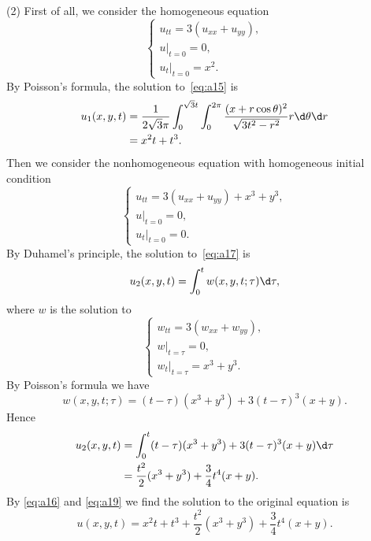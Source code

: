 \begin{solve}
  (2) First of all, we consider the homogeneous equation
  \begin{equation}\label{eq:a15}
    \begin{cases}
      u_{tt} = 3(u_{xx} + u_{yy}), \\
      u|_{t=0} = 0, \\
      u_t|_{t=0} = x^2.
    \end{cases}
  \end{equation}
  By Poisson's formula, the solution to~\eqref{eq:a15} is
  \begin{equation}\label{eq:a16}
    \begin{aligned}
      u_1(x,y,t)
      & = \frac{1}{2\sqrt{3}\pi} \int_0^{\sqrt3 t}\int_0^{2\pi} 
          \frac{(x+r\cos\theta)^2}{\sqrt{3t^2 - r^2}} r \d\theta\d r \\
      & = x^2 t + t^3.
    \end{aligned}
  \end{equation}
  Then we consider the nonhomogeneous equation with homogeneous initial condition
  \begin{equation}\label{eq:a17}
    \begin{cases}
      u_{tt} = 3(u_{xx}+u_{yy}) + x^3 + y^3, \\
      u|_{t=0} = 0, \\
      u_t|_{t=0} = 0.
    \end{cases}
  \end{equation}
  By Duhamel's principle, the solution to~\eqref{eq:a17} is
  \begin{equation}\label{eq:18}
    u_2(x,y,t) = \int_0^t w(x,y,t;\tau) \d\tau,
  \end{equation}
  where $w$ is the solution to
  \[\begin{cases}
    w_{tt} = 3(w_{xx} + w_{yy}), \\
    w|_{t=\tau} = 0, \\
    w_t|_{t=\tau} = x^3 + y^3.
  \end{cases}\]
  By Poisson's formula we have
  \[ w(x,y,t;\tau) = (t-\tau)(x^3+y^3) + 3(t-\tau)^3(x+y). \]
  Hence
  \begin{equation}\label{eq:a19}
    \begin{aligned}
      u_2(x,y,t) 
      & = \int_0^t (t-\tau)(x^3+y^3) + 3(t-\tau)^3(x+y) \d\tau \\
      & = \frac{t^2}{2}(x^3+y^3) + \frac{3}{4}t^4 (x+y).
    \end{aligned}
  \end{equation}
  By \eqref{eq:a16} and \eqref{eq:a19} we find the solution to the original
  equation is
  \begin{equation}\label{eq:a20}
    u(x,y,t) = x^2t + t^3 + \frac{t^2}{2}(x^3+y^3) + \frac{3}{4}t^4 (x+y).
  \end{equation}
\end{solve}



